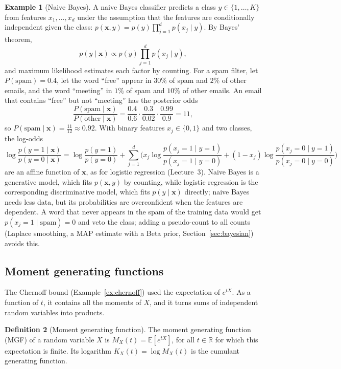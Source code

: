 \documentclass[11pt]{article}
\newcommand{\E}{\mathbb{E}}
\theoremstyle{definition}
\newtheorem{definition}{Definition}[section]
\newtheorem{example}[definition]{Example}
\theoremstyle{plain}
\theoremstyle{remark}
\begin{document}
\begin{example}[Naive Bayes]\label{ex:naive-bayes}
    A naive Bayes classifier predicts a class $y \in \{1, \ldots, K\}$ from features $x_1, \ldots, x_d$ under the assumption that the features are conditionally independent given the class: $p(\mathbf{x}, y) = p(y)\prod_{j=1}^d p(x_j \mid y)$. By Bayes' theorem,
    \[p(y \mid \mathbf{x}) \propto p(y)\prod_{j=1}^d p(x_j \mid y),\]
    and maximum likelihood estimates each factor by counting. For a spam filter, let $P(\text{spam}) = 0.4$, let the word ``free'' appear in $30\%$ of spam and $2\%$ of other emails, and the word ``meeting'' in $1\%$ of spam and $10\%$ of other emails. An email that contains ``free'' but not ``meeting'' has the posterior odds
    \[\frac{P(\text{spam} \mid \mathbf{x})}{P(\text{other} \mid \mathbf{x})} = \frac{0.4}{0.6} \cdot \frac{0.3}{0.02} \cdot \frac{0.99}{0.9} = 11,\]
    so $P(\text{spam} \mid \mathbf{x}) = \frac{11}{12} \approx 0.92$. With binary features $x_j \in \{0, 1\}$ and two classes, the log-odds
    \[\log\frac{p(y = 1 \mid \mathbf{x})}{p(y = 0 \mid \mathbf{x})} = \log\frac{p(y = 1)}{p(y = 0)} + \sum_{j=1}^d\Big(x_j\log\frac{p(x_j = 1 \mid y = 1)}{p(x_j = 1 \mid y = 0)} + (1 - x_j)\log\frac{p(x_j = 0 \mid y = 1)}{p(x_j = 0 \mid y = 0)}\Big)\]
    are an affine function of $\mathbf{x}$, as for logistic regression (Lecture~3). Naive Bayes is a generative model, which fits $p(\mathbf{x}, y)$ by counting, while logistic regression is the corresponding discriminative model, which fits $p(y \mid \mathbf{x})$ directly; naive Bayes needs less data, but its probabilities are overconfident when the features are dependent. A word that never appears in the spam of the training data would get $p(x_j = 1 \mid \text{spam}) = 0$ and veto the class; adding a pseudo-count to all counts (Laplace smoothing, a MAP estimate with a Beta prior, Section~\ref{sec:bayesian}) avoids this.
\end{example}

\subsection{Moment generating functions}\label{sec:mgf}

The Chernoff bound (Example~\ref{ex:chernoff}) used the expectation of $e^{tX}$. As a function of $t$, it contains all the moments of $X$, and it turns sums of independent random variables into products.

\begin{definition}[Moment generating function]\label{def:mgf}
    The moment generating function (MGF) of a random variable $X$ is $M_X(t) = \E[e^{tX}]$, for all $t \in \mathbb{R}$ for which this expectation is finite. Its logarithm $K_X(t) = \log M_X(t)$ is the cumulant generating function.
\end{definition}
\end{document}
